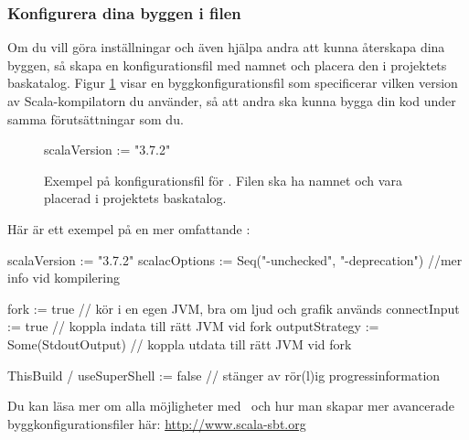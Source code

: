 \subsubsection{Konfigurera dina byggen i filen }

Om du vill göra inställningar och även hjälpa andra att kunna återskapa dina byggen, så skapa en konfigurationsfil med namnet  och placera den i projektets baskatalog. Figur \ref{fig:sbt:build-file} visar en byggkonfigurationsfil som specificerar vilken version av Scala-kompilatorn du använder, så att andra ska kunna bygga din kod under samma förutsättningar som du.

\begin{figure}[H]
\centering
\begin{Code}
scalaVersion := "3.7.2"
\end{Code}
\caption{Exempel på konfigurationsfil för \sbt. Filen ska ha namnet  och vara placerad i projektets baskatalog.}
\label{fig:sbt:build-file}
\end{figure}

\noindent Här är ett exempel på en mer omfattande :
\begin{CodeSmall}
scalaVersion   := "3.7.2"
scalacOptions  := Seq("-unchecked", "-deprecation") //mer info vid kompilering

fork           := true   // kör i en egen JVM, bra om ljud och grafik används 
connectInput   := true   // koppla indata till rätt JVM vid fork
outputStrategy := Some(StdoutOutput)  // koppla utdata till rätt JVM vid fork

ThisBuild / useSuperShell := false // stänger av rör(l)ig progressinformation
\end{CodeSmall}

\noindent Du kan läsa mer om alla möjligheter med \sbt\ och hur man skapar mer avancerade byggkonfigurationsfiler här: \url{http://www.scala-sbt.org}


